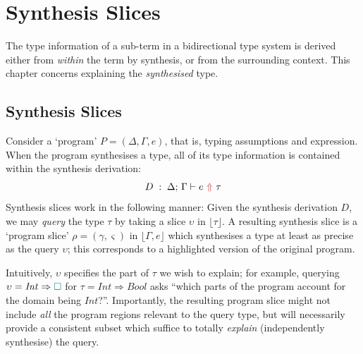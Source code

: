\section{Synthesis Slices}
\label{sec:synthesis}

\sectionlegend

\providecommand{\synslice}[2]{\mathit{SynSlice}\;#1 \mathbin{\blacktriangleleft} #2}
\providecommand{\minsynslice}[2]{\mathit{MinSynSlice}\;#1 \mathbin{\blacktriangleleft} #2}
\providecommand{\exactsynslice}[2]{\mathit{ExactSynSlice}\;#1 \mathbin{\blacktriangleleft} #2}
\providecommand{\isMin}[1]{\mathsf{IsMinimal}\,(#1)}
\providecommand{\joinsyn}{\sqcup}
\providecommand{\meetsyn}{\sqcap}
\providecommand{\pairsyn}{\times}

\noindent The type information of a sub-term in a bidirectional type system is derived either from \textit{within} the term by synthesis, or from the surrounding context. This chapter concerns explaining the \textit{synthesised} type.

\subsection{\yo Synthesis Slices}
\label{sec:syn-slice-def}

Consider a `program' $P = (\Delta, \Gamma, e)$, that is, typing assumptions and expression. When the program synthesises a type, all of its type information is contained within the synthesis derivation:
\[ D \;:\; \synthesis{e}{\tau} \]
Synthesis slices work in the following manner: Given the synthesis derivation $D$, we may \textit{query} the type $\tau$ by taking a slice $\upsilon$ in $\lfloor \tau \rfloor$. A resulting synthesis slice is a `program slice' $\rho = (\gamma, \varsigma)$ in $\lfloor \Gamma , e\rfloor$ which synthesises a type at least as precise as the query $\upsilon$; this corresponds to a highlighted version of the original program. 

Intuitively, $\upsilon$ specifies the part of $\tau$ we wish to explain; for example, querying $\upsilon = \mathit{Int} \Rightarrow {\color{teal}\Box}$ for $\tau = \mathit{Int} \Rightarrow \mathit{Bool}$ asks ``which parts of the program account for the domain being $\mathit{Int}$?''. Importantly, the resulting program slice might not include \textit{all} the program regions relevant to the query type, but will necessarily provide a consistent subset which suffice to totally \textit{explain} (independently synthesise) the query.

